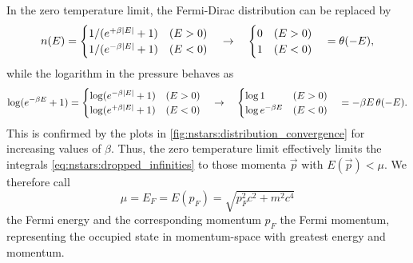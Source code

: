 In the zero temperature limit, the Fermi-Dirac distribution can be replaced by
\begin{equation}
	n(E)       =                 \begin{cases} 1 / (e^{+\beta \left\lvert E \right\rvert}+1) & (E>0) \\ 1 / (e^{-\beta \left\lvert E \right\rvert}+1) & (E<0) \end{cases}
	     \quad \rightarrow \quad \begin{cases} 0 & (E>0) \\ 1 & (E<0) \end{cases}
	     \quad =                 \theta(-E) ,
\end{equation}
while the logarithm in the pressure behaves as
\begin{equation}
	\log (e^{-\beta E}+1)       =                 \begin{cases} \log (e^{-\beta \left\lvert E \right\rvert}+1) & (E>0) \\ \log (e^{+\beta \left\lvert E \right\rvert}+1) & (E<0) \end{cases}
	                      \quad \rightarrow \quad \begin{cases} \log 1 & (E>0) \\ \log e^{-\beta E} & (E<0) \end{cases}
	                      \quad =                 -\beta E \, \theta(-E) .
\end{equation}
This is confirmed by the plots in \cref{fig:nstars:distribution_convergence} for increasing values of $\beta$.
Thus, the zero temperature limit effectively limits the integrals \eqref{eq:nstars:dropped_infinities} to those momenta $\vec{p}$ with $E(\vec{p}) < \mu$.
We therefore call
\begin{equation}
	\mu = E_F = E(p_F) = \sqrt{p_F^2 c^2 + m^2 c^4}
\end{equation}
the Fermi energy and the corresponding momentum $p_F$ the Fermi momentum, representing the occupied state in momentum-space with greatest energy and momentum.

